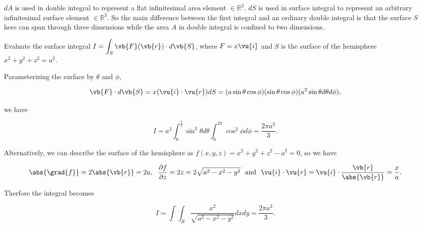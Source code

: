 \documentclass[english,a4paper,12pt]{report}
\begin{document}
\(dA\) is used in double integral to represent a flat infinitesimal area element \(\in \mathbb{R}^2\). \(dS\) is used in surface integral to represent an arbitrary infinitesimal surface element \(\in \mathbb{R}^3 \). So the main difference between the first integral and an ordinary double integral is that the surface \(S\) here can span through three dimensions while the area \(A\) in double integral is confined to two dimensions.


{Evaluate the surface integral \(\displaystyle I = \int_{S}^{} \vb{F}(\vb{r} ) \cdot d\vb{S} \), where \(F = x \vu{i}  \) and \(S\) is the surface of the hemisphere \(x^2 + y^2 + z^2 = a^2\).}
{Parameterizing the surface by \(\theta \text { and } \phi \), 

\begin{equation}
	\vb{F} \cdot d\vb{S}  = x(\vu{i} \cdot \vu{r} )dS = (a \sin \theta \cos \phi )(\sin \theta \cos \phi )(a^2\sin \theta d \theta d\phi ),
\end{equation}

we have 

\begin{equation}
	I = a^3 \int_{0}^{\frac{\pi }{2} } \sin ^3 \theta d \theta \int_{0}^{2\pi } \cos ^2\phi d\phi = \frac{2\pi a^3 }{3}.    
\end{equation}

Alternatively, we can describe the surface of the hemisphere as \(f(x,y,z) = x^2 + y^2 + z^2 - a^2 = 0\), so we have 

\begin{equation}
	\abs{\grad{f} } = 2\abs{\vb{r} } = 2a, ~~ 	\frac{\partial f}{\partial z} = 2z = 2\sqrt{a^2-x^2-y^2} ~\text { and }~ \vu{i} \cdot \vu{r} = \vu{i} \cdot \frac{\vb{r} }{\abs{\vb{r} } } = \frac{x}{a}. 
\end{equation}

Therfore the integral becomes

\begin{equation}
	I = \int \int_{R}^{} \frac{x^2}{\sqrt{a^2-x^2-y^2} }dxdy = \frac{2\pi a^3 }{3}.    
\end{equation}
 } 
 
\end{document}
